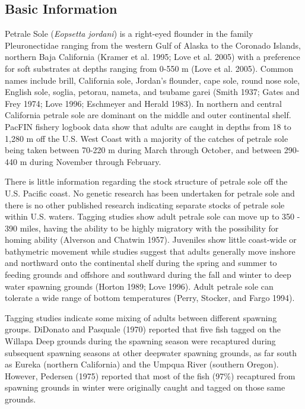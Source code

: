 \documentclass[11pt,
  english,
  letterpaper,
]{article}
\begin{document}
\hypertarget{basic-information}{%
\subsection{Basic Information}\label{basic-information}}

Petrale Sole (\emph{Eopsetta jordani}) is a right-eyed flounder in the family Pleuronectidae ranging from the western Gulf of Alaska to the Coronado Islands, northern Baja California (Kramer et al. 1995; Love et al. 2005) with a preference for soft substrates at depths ranging from 0-550 m (Love et al. 2005). Common names include brill, California sole, Jordan's flounder, cape sole, round nose sole, English sole, soglia, petorau, nameta, and tsubame garei (Smith 1937; Gates and Frey 1974; Love 1996; Eschmeyer and Herald 1983). In northern and central California petrale sole are dominant on the middle and outer continental shelf. PacFIN fishery logbook data show that adults are caught in depths from 18 to 1,280 m off the U.S. West Coast with a majority of the catches of petrale sole being taken between 70-220 m during March through October, and between 290-440 m during November through February.

There is little information regarding the stock structure of petrale sole off the U.S. Pacific coast. No genetic research has been undertaken for petrale sole and there is no other published research indicating separate stocks of petrale sole within U.S. waters. Tagging studies show adult petrale sole can move up to 350 - 390 miles, having the ability to be highly migratory with the possibility for homing ability (Alverson and Chatwin 1957). Juveniles show little coast-wide or bathymetric movement while studies suggest that adults generally move inshore and northward onto the continental shelf during the spring and summer to feeding grounds and offshore and southward during the fall and winter to deep water spawning grounds (Horton 1989; Love 1996). Adult petrale sole can tolerate a wide range of bottom temperatures (Perry, Stocker, and Fargo 1994).

Tagging studies indicate some mixing of adults between different spawning groups. DiDonato and Pasquale (1970) reported that five fish tagged on the Willapa Deep grounds during the spawning season were recaptured during subsequent spawning seasons at other deepwater spawning grounds, as far south as Eureka (northern California) and the Umpqua River (southern Oregon). However, Pedersen (1975) reported that most of the fish (97\%) recaptured from spawning grounds in winter were originally caught and tagged on those same grounds.
\end{document}
